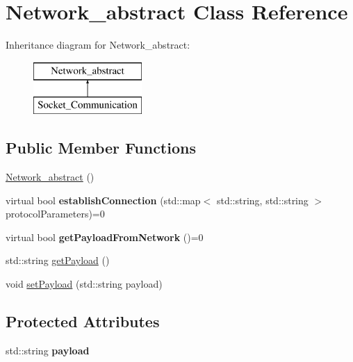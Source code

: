 \hypertarget{class_network__abstract}{}\section{Network\+\_\+abstract Class Reference}
\label{class_network__abstract}
Inheritance diagram for Network\+\_\+abstract\+:\begin{figure}[H]
\begin{center}
\leavevmode
\includegraphics[height=2.000000cm]{class_network__abstract}
\end{center}
\end{figure}
\subsection*{Public Member Functions}
\begin{DoxyCompactItemize}
\item 
\mbox{\hyperlink{class_network__abstract_ada3172f8190180cbf9be59b2fd0450c3}{Network\+\_\+abstract}} ()
\item 
\mbox{\label{class_network__abstract_a67c01479a3d2abcc9e69667006fd1db8}} 
virtual bool {\bfseries establish\+Connection} (std\+::map$<$ std\+::string, std\+::string $>$ protocol\+Parameters)=0
\item 
\mbox{\label{class_network__abstract_a0c20f830bac3ab698e777862a855d918}} 
virtual bool {\bfseries get\+Payload\+From\+Network} ()=0
\item 
std\+::string \mbox{\hyperlink{class_network__abstract_a70a5435d01dca002738e44ac148a97b1}{get\+Payload}} ()
\item 
void \mbox{\hyperlink{class_network__abstract_ac5bcf2e989845790f648118b7f382391}{set\+Payload}} (std\+::string payload)
\end{DoxyCompactItemize}
\subsection*{Protected Attributes}
\begin{DoxyCompactItemize}
\item 
\mbox{\label{class_network__abstract_a56ca3ed6ac9c2a0225ea2d0f42f6b03e}} 
std\+::string {\bfseries payload}
\end{DoxyCompactItemize}


